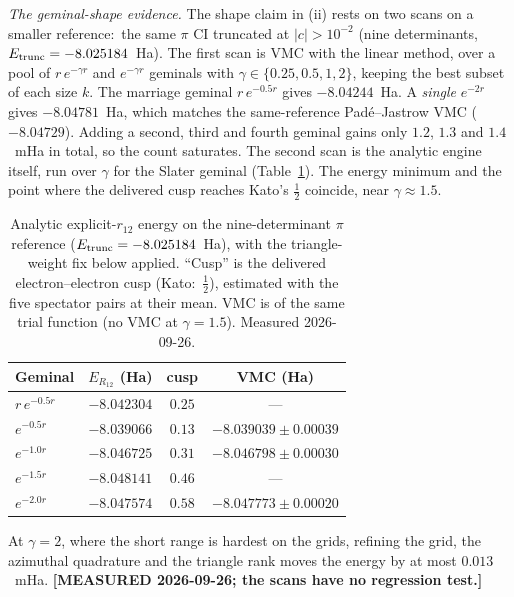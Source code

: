 \documentclass[aps,pra,twocolumn,superscriptaddress,longbibliography]{revtex4-2}
\begin{document}
\emph{The geminal-shape evidence.}  The shape claim in (ii) rests on two scans on
a smaller reference:\ the same $\pi$ CI truncated at $|c|>10^{-2}$ (nine
determinants, $E_{\rm trunc}=-8.025184$~Ha).  The first scan is VMC with the
linear method, over a pool of $r\,e^{-\gamma r}$ and $e^{-\gamma r}$ geminals
with $\gamma\in\{0.25,0.5,1,2\}$, keeping the best subset of each size $k$.  The
marriage geminal $r\,e^{-0.5r}$ gives $-8.04244$~Ha.  A \emph{single}
$e^{-2r}$ gives $-8.04781$~Ha, which matches the same-reference Pad\'e--Jastrow
VMC ($-8.04729$).  Adding a second, third and fourth geminal gains only $1.2$,
$1.3$ and $1.4$~mHa in total, so the count saturates.  The second scan is the
analytic engine itself, run over $\gamma$ for the Slater geminal
(Table~\ref{tab:geminal_gamma}).  The energy minimum and the point where the
delivered cusp reaches Kato's $\tfrac12$ coincide, near $\gamma\approx1.5$.
\begin{table}[h]
\caption{Analytic explicit-$r_{12}$ energy on the nine-determinant $\pi$
reference ($E_{\rm trunc}=-8.025184$~Ha), with the triangle-weight fix below
applied.  ``Cusp'' is the delivered electron--electron cusp (Kato:\ $\tfrac12$),
estimated with the five spectator pairs at their mean.  VMC is of the same trial
function (no VMC at $\gamma=1.5$).  Measured 2026-09-26.}
\label{tab:geminal_gamma}
\begin{ruledtabular}
\begin{tabular}{lccc}
Geminal & $E_{R_{12}}$ (Ha) & cusp & VMC (Ha) \\
\hline
$r\,e^{-0.5r}$ & $-8.042304$ & $0.25$ & --- \\
$e^{-0.5r}$ & $-8.039066$ & $0.13$ & $-8.039039\pm0.00039$ \\
$e^{-1.0r}$ & $-8.046725$ & $0.31$ & $-8.046798\pm0.00030$ \\
$e^{-1.5r}$ & $\mathbf{-8.048141}$ & $0.46$ & --- \\
$e^{-2.0r}$ & $-8.047574$ & $0.58$ & $-8.047773\pm0.00020$ \\
\end{tabular}
\end{ruledtabular}
\end{table}
At $\gamma=2$, where the short range is hardest on the grids, refining the grid,
the azimuthal quadrature and the triangle rank moves the energy by at most
$0.013$~mHa.  \textbf{[MEASURED 2026-09-26; the scans have no regression test.]}
\end{document}
